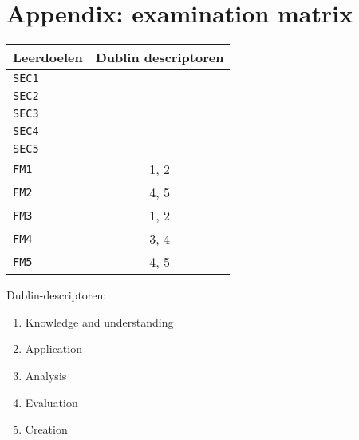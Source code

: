 \section*{Appendix: examination matrix}
	\begin{tabular}{| l | c |}
		\hline
		Leerdoelen & Dublin descriptoren \\
		\hline
		\texttt{SEC1} & \red{...} \\
		\hline
		\texttt{SEC2} & \red{...} \\
		\hline
		\texttt{SEC3} & \red{...} \\
		\hline
		\texttt{SEC4} & \red{...} \\
		\hline
		\texttt{SEC5} & \red{...} \\
		\hline

		\texttt{FM1} & 1, 2 \\
		\hline
		\texttt{FM2} & 4, 5 \\
		\hline
		\texttt{FM3} & 1, 2 \\
		\hline
		\texttt{FM4} & 3, 4 \\
		\hline
		\texttt{FM5} & 4, 5 \\
		\hline
	\end{tabular}
	
	\vspace{1cm}

	Dublin-descriptoren:
	\begin{enumerate}
		\item Knowledge and understanding
		\item Application
		\item Analysis
		\item Evaluation
		\item Creation
	\end{enumerate}